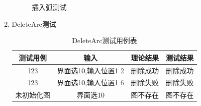 \documentclass[supercite]{HustGraduPaper}
\theoremstyle{definition}
\begin{document}
\begin{enumerate}
\begin{figure}[htb]
		      \caption{插入弧测试}
	      \end{figure}
	      \newpage
	\item DeleteArc测试
	      \begin{table}[htb]
		      \begin{center}
			      \setlength{\tabcolsep}{2.0mm}
			      \caption{DeleteArc测试用例表}
			      \label{t10}
			      \begin{tabular}{|c|c|c|c|}
				      \hline
				      测试用例   & 输入                 & 理论结果 & 测试结果 \\
				      \hline
				      \hline
				      123        & 界面选10,输入位置1 2 & 删除成功 & 删除成功 \\
				      \hline
				      123        & 界面选10,输入位置1 6 & 删除失败 & 删除失败 \\
				      \hline
				      未初始化图 & 界面选10             & 图不存在 & 图不存在 \\
				      \hline
			      \end{tabular}
		      \end{center}
	      \end{table}
	      \begin{figure}[htb]
		      \centering
		      \quad
		      \quad
		      \\

\end{figure}
\end{enumerate}
\end{document}
